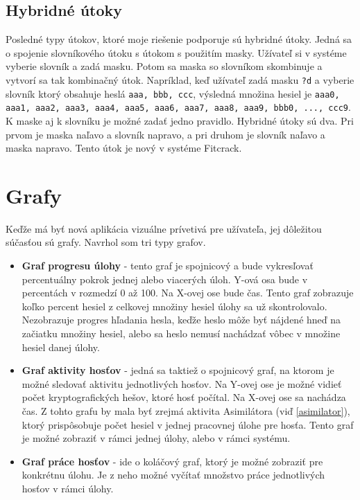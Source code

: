 \documentclass[slovak]{fitthesis}
\begin{document}
\subsection{Hybridné útoky} \label{hybridAttack}
Posledné typy útokov, ktoré moje riešenie podporuje sú hybridné útoky. Jedná sa o spojenie slovníkového útoku s útokom s použitím masky. Užívateľ si v systéme vyberie slovník a zadá masku. Potom sa maska so slovníkom skombinuje a vytvorí sa tak kombinačný útok. Napríklad, keď užívateľ zadá masku \texttt{?d} a vyberie slovník ktorý obsahuje heslá \texttt{aaa, bbb, ccc}, výsledná množina hesiel je 
\texttt{aaa0, aaa1, aaa2, aaa3, aaa4, aaa5, aaa6, aaa7, aaa8, aaa9, bbb0, ..., ccc9}. K maske aj k slovníku je možné zadať jedno pravidlo. Hybridné útoky sú dva. Pri prvom je maska naľavo a slovník napravo, a pri druhom je slovník naľavo a maska napravo. Tento útok je nový v systéme Fitcrack.


\section{Grafy}\label{graphs}
Keďže má byť nová aplikácia vizuálne prívetivá pre užívateľa, jej dôležitou súčasťou sú grafy. Navrhol som tri typy grafov.
\begin{itemize}
    \item \textbf{Graf progresu úlohy} \label{progressGraph} - tento graf je spojnicový a bude vykresľovať percentuálny pokrok jednej alebo viacerých úloh. Y-ová osa bude v percentách v rozmedzí 0 až 100. Na X-ovej ose bude čas. Tento graf zobrazuje koľko percent hesiel z celkovej množiny hesiel úlohy sa už skontrolovalo. Nezobrazuje progres hľadania hesla, keďže heslo môže byť nájdené hneď na začiatku množiny hesiel, alebo sa heslo nemusí nachádzať vôbec v množine hesiel danej úlohy.
    \item \textbf{Graf aktivity hosťov} - jedná sa taktiež o spojnicový graf, na ktorom je možné sledovať aktivitu jednotlivých hosťov. Na Y-ovej ose je možné vidieť počet kryptografických hešov, ktoré hosť počítal. Na X-ovej ose sa nachádza čas. Z tohto grafu by mala byť zrejmá aktivita Asimilátora (viď \ref{asimilator}), ktorý prispôsobuje počet hesiel v jednej pracovnej úlohe pre hosťa. Tento graf je možné zobraziť v rámci jednej úlohy, alebo v rámci systému.
    \item \textbf{Graf práce hosťov} - ide o koláčový graf, ktorý je možné zobraziť pre konkrétnu úlohu. Je z neho možné vyčítať množstvo práce jednotlivých hosťov v rámci úlohy.
\end{itemize}
\end{document}
